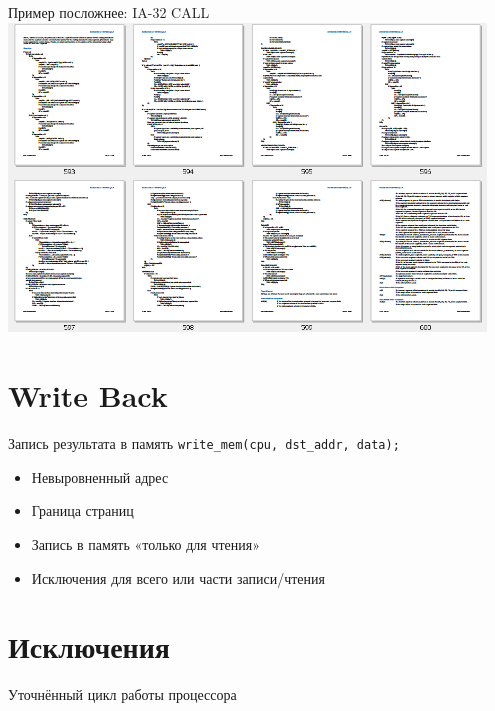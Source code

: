 \documentclass{beamer}
\begin{document}
\begin{frame}{Пример посложнее: IA-32 CALL}
\centering
\includegraphics[width=0.95\textwidth]{./ia32-call}

\end{frame}

\section{Write Back}

\begin{frame}{Запись результата в память}
\texttt{write_mem(cpu, dst_addr, data);}\pause

\begin{itemize}
    \item Невыровненный адрес
    \item Граница страниц
    \item Запись в память «только для чтения»
    \item Исключения для всего или части записи/чтения
\end{itemize}

\end{frame}

\section{Исключения}

\begin{frame}[shrink=0.6]{Уточнённый цикл работы процессора}
\centering



\end{frame}
\end{document}
